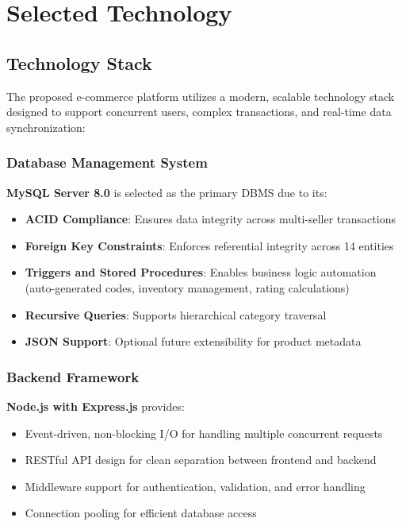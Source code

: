 \newpage

\section{Selected Technology}

\subsection{Technology Stack}

The proposed e-commerce platform utilizes a modern, scalable technology stack designed to support concurrent users, complex transactions, and real-time data synchronization:

\subsubsection{Database Management System}

\textbf{MySQL Server 8.0} is selected as the primary DBMS due to its:
\begin{itemize}
    \item \textbf{ACID Compliance}: Ensures data integrity across multi-seller transactions
    \item \textbf{Foreign Key Constraints}: Enforces referential integrity across 14 entities
    \item \textbf{Triggers and Stored Procedures}: Enables business logic automation (auto-generated codes, inventory management, rating calculations)
    \item \textbf{Recursive Queries}: Supports hierarchical category traversal
    \item \textbf{JSON Support}: Optional future extensibility for product metadata
\end{itemize}

\subsubsection{Backend Framework}

\textbf{Node.js with Express.js} provides:
\begin{itemize}
    \item Event-driven, non-blocking I/O for handling multiple concurrent requests
    \item RESTful API design for clean separation between frontend and backend
    \item Middleware support for authentication, validation, and error handling
    \item Connection pooling for efficient database access
\end{itemize}

